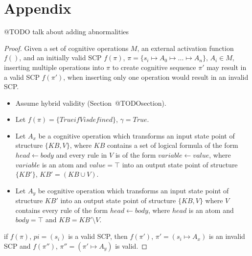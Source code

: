 \chapter*{Appendix} \label{chp:appendix}
@TODO talk about adding abnormalities



\begin{proof} \label{proof:insertionSearch}
Given a set of cognitive operations $M$, an external activation function $f()$, and an initially valid SCP $f(\pi)$, $\pi=\{s_i \longmapsto A_0 \longmapsto ... \longmapsto A_n\}$, $A_i \in M$, inserting multiple operations into $\pi$ to create cognitive sequence $\pi'$ may result in a valid SCP $f(\pi')$, when inserting only one operation would result in an invalid SCP.

\begin{itemize}
\item Assume hybrid validity (Section~@TODOsection).
\item Let $f(\pi)=\{True if V is defined\}$, $\gamma = True$.
\item Let $A_x$ be a cognitive operation which transforms an input state point of structure $\{KB, V\}$, where $KB$ contains a set of logical formula of the form $head \leftarrow body$ and every rule in $V$ is of the form $variable \leftarrow value$, where $variable$ is an atom and  $value=\top$ into an output state point of structure $\{KB'\}$, $KB'=(KB \cup V)$.
\item Let $A_y$ be cognitive operation which transforms an input state point of structure $KB'$ into an output state point of structure $\{KB, V\}$ where $V$ contains every rule of the form $head \leftarrow body$, where $head$ is an atom and $body=\top$ and $KB= KB' \setminus V$.
\end{itemize}
\item if $f(\pi)$, $pi=(s_i)$ is a valid SCP, then $f(\pi')$, $\pi'=(s_i\longmapsto A_x)$ is an invalid SCP and $f(\pi'')$, $\pi''=(\pi'\longmapsto A_y)$ is valid.
\end{proof}

